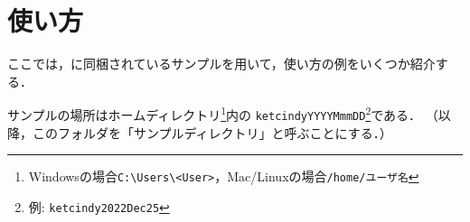 
\chapter{使い方}

ここでは，{\ketcindy}に同梱されているサンプルを用いて，使い方の例をいくつか紹介する．

サンプルの場所はホームディレクトリ\footnote{Windowsの場合\verb|C:\Users\<User>|，Mac/Linuxの場合\verb|/home/ユーザ名|}内の
\verb|ketcindyYYYYMmmDD|\footnote{例: \verb|ketcindy2022Dec25|}である．
（以降，このフォルダを「サンプルディレクトリ」と呼ぶことにする．）